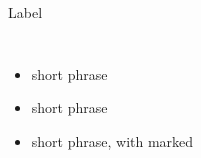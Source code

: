 \documentclass[8pt,aspectratio=169]{beamer}
\begin{document}
%

%
\begin{frame}{Label}

  \begin{columns}[c]
      \begin{itemize}\setlength\itemsep{0.7em}
        \item short phrase
        \item short phrase
        \item short phrase, with  marked
      \end{itemize}

  \end{columns}

  \showtakeaway
  \note{}
\end{frame}
\end{document}
